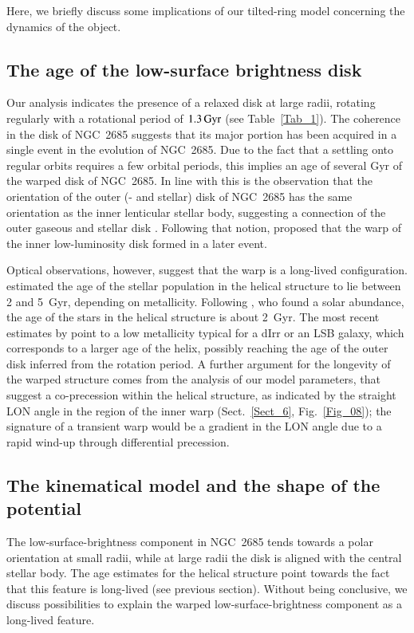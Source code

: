 \documentclass[oldversion]{aa}
\begin{document}
Here, we briefly discuss some implications of our tilted-ring model
concerning the dynamics of the object.
%
%
\subsection{The age of the low-surface brightness disk}
\label{Sect_8.1}
Our analysis indicates the presence of a relaxed  disk at
large radii, rotating regularly with a rotational period of $1.3\,\rm
Gyr$ (see Table~\ref{Tab_1}). The coherence in the  disk of
NGC~2685 suggests that its major portion has been acquired in a single
event in the evolution of NGC~2685. Due to the fact that a settling
onto regular orbits requires a few orbital periods, this implies an
age of several Gyr of the warped  disk of NGC~2685. In line
with this is the observation that the orientation of the outer
 (- and stellar) disk of NGC~2685 has the same orientation
as the inner lenticular stellar body, suggesting a connection of the
outer gaseous and stellar disk \citep[][]{Morganti06}. Following that
notion, \citet[][]{Morganti06} proposed that the warp of the inner
low-luminosity disk formed in a later event.

Optical observations, however, suggest that the warp is a long-lived
configuration. \citet[][]{Peletier93} estimated the age of the stellar
population in the helical structure to lie between 2 and 5~Gyr,
depending on metallicity. Following \citet[][]{Eskridge97}, who found
a solar abundance, the age of the stars in the helical structure is
about 2~Gyr. The most recent estimates by \citet[][]{Karataeva04}
point to a low metallicity typical for a dIrr or an LSB galaxy, which
corresponds to a larger age of the helix, possibly reaching the age of
the outer disk inferred from the rotation period. A further argument
for the longevity of the warped structure comes from the analysis of
our model parameters, that suggest a co-precession within the helical
structure, as indicated by the straight LON angle in the region of the
inner warp (Sect.~\ref{Sect_6}, Fig.~\ref{Fig_08}); the signature of a
transient warp would be a gradient in the LON angle due to a rapid
wind-up through differential precession.
%
%
\subsection{The kinematical model and the shape of the potential}
\label{Sect_8.2}
The low-surface-brightness component in NGC~2685 tends towards a polar
orientation at small radii, while at large radii the disk is aligned
with the central stellar body. The age estimates for the helical
structure point towards the fact that this feature is long-lived (see
previous section). Without being conclusive, we discuss possibilities
to explain the warped low-surface-brightness component as a long-lived
feature.
\end{document}
